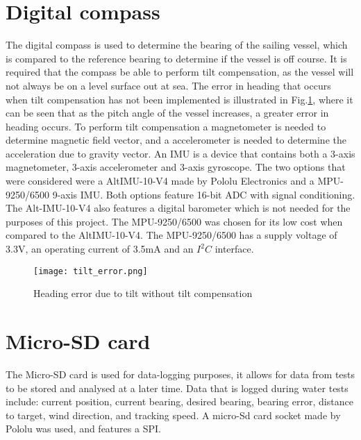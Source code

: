 \section{Digital compass}
The digital compass is used to determine the bearing of the sailing vessel, which is compared to the reference bearing to determine if the vessel is off course. It is 
required that the compass be able to perform tilt compensation, as the vessel will not always be on a level surface out at sea. The error in heading that occurs when tilt
compensation has not been implemented is illustrated in Fig.\ref{fig:tilt_error}, where it can be seen that as the pitch angle of the vessel increases, a greater error in 
heading occurs\cite{tilt_error}. To perform tilt compensation a magnetometer is needed to determine magnetic field vector, and a 
accelerometer is needed to determine the acceleration due to gravity vector. An IMU is a device that contains both a 3-axis magnetometer, 3-axis accelerometer and 3-axis gyroscope.
The two options that were considered were a AltIMU-10-V4\cite{altimu-10} made by Pololu Electronics and a MPU-9250/6500 9-axis IMU\cite{mpu-9250}. Both options feature 
16-bit ADC with signal conditioning. The 
Alt-IMU-10-V4 also features a digital barometer which is not needed for the purposes of this project. The MPU-9250/6500 was chosen for its low cost when compared 
to the AltIMU-10-V4. The MPU-9250/6500 has a supply voltage of 3.3V, an operating current of 3.5mA and an $I^{2}C$ interface.

\begin{figure}[!h]
  \centering
  \texttt{[image: tilt\_error.png]}
  \caption[Tilt error]{Heading error due to tilt without tilt compensation\cite{tilt_error}}
  \label{fig:tilt_error}
\end{figure}


\section{Micro-SD card}
The Micro-SD card is used for data-logging purposes, it allows for data from tests to be stored and analysed at a later time. Data that is logged during water tests 
include: current position, current bearing, desired bearing, bearing error, distance to target, wind direction, and tracking speed. A micro-Sd card socket made 
by Pololu\cite{sd} was used, and features a SPI.  


